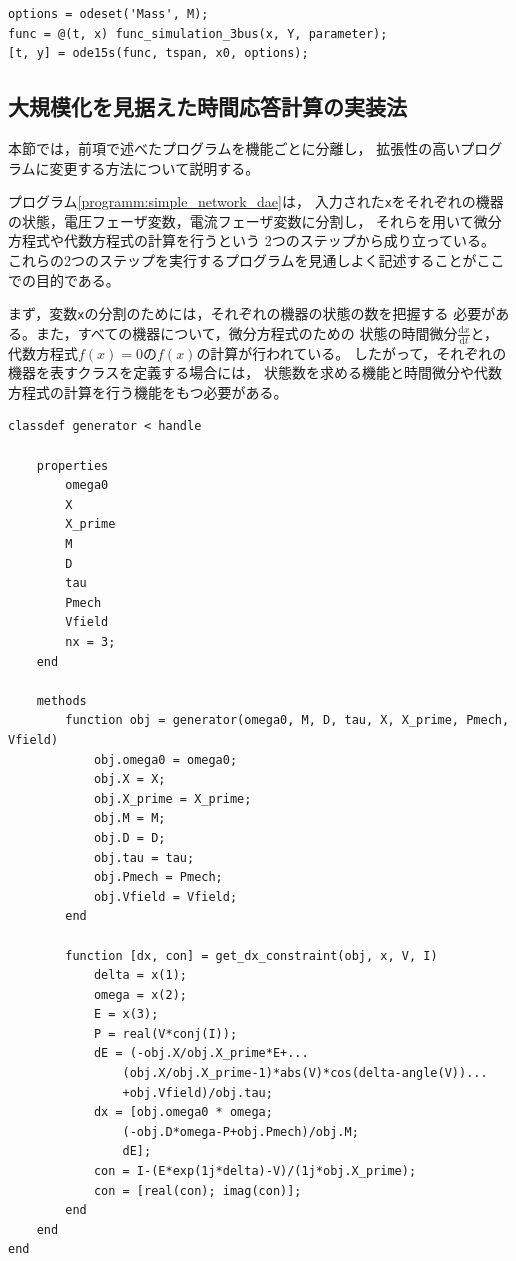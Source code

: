 \documentclass[tombow,dvipdfmx]{corona-a5-1.1}
\begin{document}
{\begin{例}[電力系統のシミュレーション]
\begin{PROGRAMA}[count,title={main\_simulation\_simple.m}]
\begin{verbatim}
options = odeset('Mass', M);
func = @(t, x) func_simulation_3bus(x, Y, parameter);
[t, y] = ode15s(func, tspan, x0, options); 
\end{verbatim}
\end{PROGRAMA}

\end{例}

\subsection{大規模化を見据えた時間応答計算の実装法}

本節では，前項で述べたプログラムを機能ごとに分離し，
拡張性の高いプログラムに変更する方法について説明する。
\begin{例}
  プログラム\ref{programm:simple_network_dae}は，
  入力された\verb|x|をそれぞれの機器の状態，電圧フェーザ変数，電流フェーザ変数に分割し，
  それらを用いて微分方程式や代数方程式の計算を行うという
  2つのステップから成り立っている。
  これらの2つのステップを実行するプログラムを見通しよく記述することがここでの目的である。
  
  まず，変数\verb|x|の分割のためには，それぞれの機器の状態の数を把握する
  必要がある。また，すべての機器について，微分方程式のための
  状態の時間微分$\tfrac{\mathrm dx}{\mathrm dt}$と，
  代数方程式$f(x)=0$の$f(x)$の計算が行われている。
  したがって，それぞれの機器を表すクラスを定義する場合には，
  状態数を求める機能と時間微分や代数方程式の計算を行う機能をもつ必要がある。
  

  \begin{PROGRAMA}[count,title={generator.m}]\label{programm:generator}
  \begin{verbatim}
classdef generator < handle
    
    properties
        omega0
        X
        X_prime
        M
        D
        tau
        Pmech
        Vfield
        nx = 3;
    end
    
    methods
        function obj = generator(omega0, M, D, tau, X, X_prime, Pmech, Vfield)
            obj.omega0 = omega0;
            obj.X = X;
            obj.X_prime = X_prime;
            obj.M = M;
            obj.D = D;
            obj.tau = tau;
            obj.Pmech = Pmech;
            obj.Vfield = Vfield;
        end
        
        function [dx, con] = get_dx_constraint(obj, x, V, I)
            delta = x(1);
            omega = x(2);
            E = x(3);
            P = real(V*conj(I));
            dE = (-obj.X/obj.X_prime*E+...
                (obj.X/obj.X_prime-1)*abs(V)*cos(delta-angle(V))...
                +obj.Vfield)/obj.tau;
            dx = [obj.omega0 * omega;
                (-obj.D*omega-P+obj.Pmech)/obj.M;
                dE];
            con = I-(E*exp(1j*delta)-V)/(1j*obj.X_prime);
            con = [real(con); imag(con)];
        end
    end
end
  \end{verbatim}
  \end{PROGRAMA}
\end{例}
}
\newpage
\end{document}
